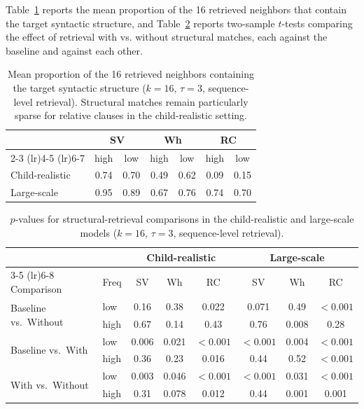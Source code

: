 Table~\ref{tab:struc_rate} reports the mean proportion of the 16 retrieved neighbors that contain the target syntactic structure, and Table~\ref{tab:struc_ttests} reports two-sample $t$-tests comparing the effect of retrieval with vs. without structural matches, each against the baseline and against each other.

\begin{table}[ht]
\centering
\small
\caption{Mean proportion of the 16 retrieved neighbors containing the
target syntactic structure ($k=16$, $\tau=3$, sequence-level retrieval). Structural matches remain particularly sparse for relative clauses in the child-realistic setting.}
\label{tab:struc_rate}
\begin{tabular}{lcccccc}
\toprule
& \multicolumn{2}{c}{\textbf{SV}}
& \multicolumn{2}{c}{\textbf{Wh}}
& \multicolumn{2}{c}{\textbf{RC}} \\
\cmidrule(lr){2-3}
\cmidrule(lr){4-5}
\cmidrule(lr){6-7}
& high & low & high & low & high & low \\
\midrule
Child-realistic & 0.74 & 0.70 & 0.49 & 0.62 & 0.09 & 0.15 \\
Large-scale     & 0.95 & 0.89 & 0.67 & 0.76 & 0.74 & 0.70 \\
\bottomrule
\end{tabular}
\end{table}

\begin{table}[ht]
\centering
\small
\caption{$p$-values for structural-retrieval comparisons in the
child-realistic and large-scale models ($k=16$, $\tau=3$,
sequence-level retrieval).}
\label{tab:struc_ttests}
\begin{tabular}{llcccccc}
\toprule
& & \multicolumn{3}{c}{\textbf{Child-realistic}}
& \multicolumn{3}{c}{\textbf{Large-scale}} \\
\cmidrule(lr){3-5}
\cmidrule(lr){6-8}
Comparison & Freq & SV & Wh & RC & SV & Wh & RC \\
\midrule

\multirow{2}{*}{Baseline vs.\ Without}
& low  & 0.16 & 0.38 & 0.022
       & 0.071 & 0.49  & $<0.001$ \\
& high & 0.67 & 0.14 & 0.43
       & 0.76  & 0.008 & 0.28 \\

\multirow{2}{*}{Baseline vs.\ With}
& low  & 0.006 & 0.021 & $<0.001$
       & $<0.001$ & 0.004 & $<0.001$ \\
& high & 0.36 & 0.23 & 0.016
       & 0.44 & 0.52 & $<0.001$ \\

\multirow{2}{*}{With vs.\ Without}
& low  & 0.003 & 0.046 & $<0.001$
       & $<0.001$ & 0.031 & $<0.001$ \\
& high & 0.31 & 0.078 & 0.012
       & 0.44 & 0.001 & 0.001 \\

\bottomrule
\end{tabular}
\end{table}


